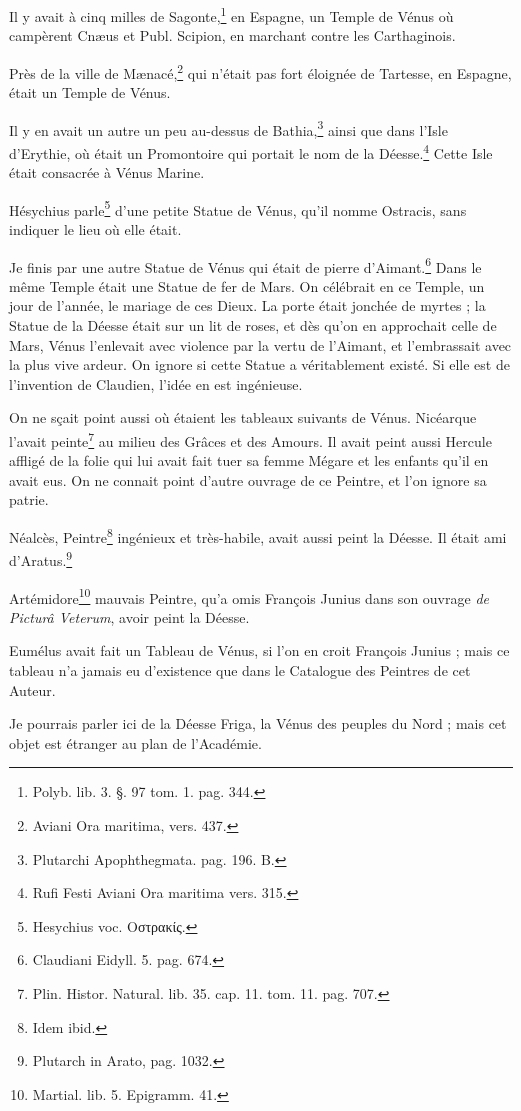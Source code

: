 \documentclass[a4paper, 11pt, oneside, polutonikogreek, french]{article}
\begin{document}
Il y avait à cinq milles de Sagonte,\footnote{Polyb. lib. 3. §. 97 tom. 1. pag. 344.} en Espagne, un Temple de Vénus où campèrent Cnæus et Publ. Scipion, en marchant contre les Carthaginois.

Près de la ville de Mænacé,\footnote{Aviani Ora maritima, vers. 437.} qui n'était pas fort éloignée de Tartesse, en Espagne, était un Temple de Vénus.

Il y en avait un autre un peu au-dessus de Bathia,\footnote{Plutarchi Apophthegmata. pag. 196. B.} ainsi que dans l'Isle d'Erythie, où était un Promontoire qui portait le nom de la Déesse.\footnote{Rufi Festi Aviani Ora maritima vers. 315.} Cette Isle était consacrée à Vénus Marine.

Hésychius parle\footnote{Hesychius voc. Οστρακίς.} d'une petite Statue de Vénus, qu'il nomme Ostracis, sans indiquer le lieu où elle était.

Je finis par une autre Statue de Vénus qui était de pierre d'Aimant.\footnote{Claudiani Eidyll. 5. pag. 674.} Dans le même Temple était une Statue de fer de Mars. On célébrait en ce Temple, un jour de l'année, le mariage de ces Dieux. La porte était jonchée de myrtes ; la Statue de la Déesse était sur un lit de roses, et dès qu'on en approchait celle de Mars, Vénus l'enlevait avec violence par la vertu de l'Aimant, et l'embrassait avec la plus vive ardeur. On ignore si cette Statue a véritablement existé. Si elle est de l'invention de Claudien, l'idée en est ingénieuse.

On ne sçait point aussi où étaient les tableaux suivants de Vénus. Nicéarque l'avait peinte\footnote{Plin. Histor. Natural. lib. 35. cap. 11. tom. 11. pag. 707.} au milieu des Grâces et des Amours. Il avait peint aussi Hercule affligé de la folie qui lui avait fait tuer sa femme Mégare et les enfants qu'il en avait eus. On ne connait point d'autre ouvrage de ce Peintre, et l'on ignore sa patrie.

Néalcès, Peintre\footnote{Idem ibid.} ingénieux et très-habile, avait aussi peint la Déesse. Il était ami d'Aratus.\footnote{Plutarch in Arato, pag. 1032.}

Artémidore\footnote{Martial. lib. 5. Epigramm. 41.} mauvais Peintre, qu'a omis François Junius dans son ouvrage \emph{de Picturâ Veterum}, avoir peint la Déesse.

Eumélus avait fait un Tableau de Vénus, si l'on en croit François Junius ; mais ce tableau n'a jamais eu d'existence que dans le Catalogue des Peintres de cet Auteur.

Je pourrais parler ici de la Déesse Friga, la Vénus des peuples du Nord ; mais cet objet est étranger au plan de l'Académie.
\end{document}
